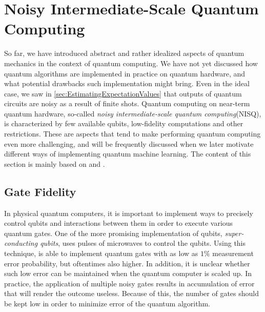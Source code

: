 \section{Noisy Intermediate-Scale Quantum Computing}\label{sec:Nisq}
So far, we have introduced abstract and rather idealized aspects of quantum mechanics in the context of quantum computing. We have not yet discussed how quantum algorithms are implemented in practice on quantum hardware, and what potential drawbacks such implementation might bring. Even in the ideal case, we saw in \autoref{sec:EstimatingExpectationValues} that outputs of quantum circuits are noisy as a result of finite shots. Quantum computing on near-term quantum hardware, so-called \emph{noisy intermediate-scale quantum computing}(NISQ)\cite{Preskill_2018}, is characterized by few available qubits, low-fidelity computations and other restrictions. These are aspects that tend to make performing quantum computing even more challenging, and will be frequently discussed when we later motivate different ways of implementing quantum machine learning. The content of this section is mainly based on \cite{SupervisedwquantumComputers} and \cite{Preskill_2018}.


\subsection{Gate Fidelity}\label{sec:GateFidelity}
In physical quantum computers, it is important to implement ways to precisely control qubits and interactions between them in order to execute various quantum gates. One of the more promising implementation of qubits, \emph{super-conducting qubits}, uses pulses of microwaves to control the qubits. Using this technique, \citet{Barends_2014} is able to implement quantum gates with as low as $1\%$ measurement error probability, but oftentimes also higher. In addition, it is unclear whether such low error can be maintained when the quantum computer is scaled up. In practice, the application of multiple noisy gates results in accumulation of error that will render the outcome useless\cite{Preskill_2018}. Because of this, the number of gates should be kept low in order to minimize error of the quantum algorithm. 

